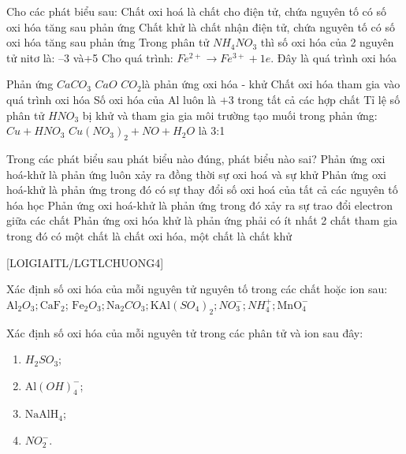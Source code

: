 \begin{ex}
	Cho các phát biểu sau:
	\choiceTF
	{Chất oxi hoá là chất cho điện tử, chứa nguyên tố có số oxi hóa tăng sau phản ứng}
	{Chất khử là chất nhận điện tử, chứa nguyên tố có số oxi hóa tăng sau phản ứng}
	{Trong phân tử $NH_4NO_3$ thì số oxi hóa của 2 nguyên tử nitơ là: –3 và+5}
	{\True Cho quá trình: $Fe^{2+} → Fe^{3+}+1e$. Đây là quá trình oxi hóa}
	\loigiai{}
\end{ex}
\begin{ex}[]
	\choiceTF
	{Phản ứng $CaCO_3$ \MuiTen [$t^\circ$][xt][1.2][][][\arrowL] $CaO$  \explus  $CO_2$\MuiTenU là phản ứng oxi hóa - khử}
	{Chất oxi hóa tham gia vào quá trình oxi hóa}
	{Số oxi hóa của Al luôn là $+3$ trong tất cả các hợp chất}
	{\True Tỉ lệ số phân tử $HNO_3$ bị khử và tham gia gia môi trường tạo muối trong phản ứng:
		$Cu + HNO_3 $ \MuiTen $ Cu{(NO_3)}_2 + NO + H_2O$ là 3:1}
	\loigiai{}
\end{ex}
\begin{ex}
	Trong các phát biểu sau phát biểu nào đúng, phát biểu nào sai?
	\choiceTF
	{\True Phản ứng oxi hoá-khử là phản ứng luôn xảy ra đồng thời sự oxi hoá và sự khử}
	{Phản ứng oxi hoá-khử là phản ứng trong đó có sự thay đổi số oxi hoá của tất cả các nguyên tố hóa học}
	{\True Phản ứng oxi hoá-khử là phản ứng trong đó xảy ra sự trao đổi electron giữa các chất}
	{Phản ứng oxi hóa khử là phản ứng phải có ít nhất 2 chất tham gia trong đó có một chất là chất oxi hóa, một chất là chất khử}
	\loigiai{}
\end{ex}
[LOIGIAITL/LGTLCHUONG4]
\luuloigiaibt
\begin{bt}
	Xác định số oxi hóa của mỗi nguyên tử nguyên tố trong các chất hoặc ion sau: $\mathrm{Al}_2O_3; \mathrm{CaF}_2$; $\mathrm{Fe}_2O_3; \mathrm{Na}_2CO_3; \mathrm{KAl}\left(SO_4\right)_2; NO_3^{-}; NH_4^{+}; \mathrm{MnO}_4^{-}$
\end{bt}

\begin{bt}
	Xác định số oxi hóa của mỗi nguyên tử trong các phân tử và ion sau đây:
	\begin{enumerate}
		\item $H_2SO_3$;
		\item $\mathrm{Al}(OH)_4^{-}$;
		\item $\mathrm{NaAlH}_4$;
		\item $NO_2^{-}$.
	\end{enumerate}
\end{bt}

